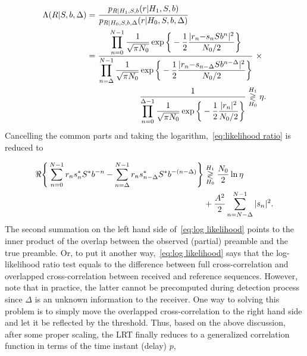 \begin{equation}
  \label{eq:likelihood ratio}
  \begin{aligned}
  \Lambda(R|S,b,\Delta)=&~\frac{p_{R|H_1,S,b}(r|H_1,S,b)}{p_{R|H_0,S,b,\Delta}(r|H_0,S,b,\Delta)} \\
  =&~\frac{\displaystyle \prod_{n=0}^{N-1}\frac{1}{\sqrt{\pi N_0}}\exp{\bigg\{-\frac{1}{2}\frac{|r_{n}{-}s_nSb^n|^2}{N_0/2}\bigg\}}}{\displaystyle \prod_{n=\Delta}^{N-1} \frac{1}{\sqrt{\pi N_0}} \exp{\bigg\{-\frac{1}{2}\frac{|r_{n}{-}s_{n-\Delta}Sb^{n-\Delta}|^2}{N_0/2}\bigg\}}} ~\times \\
  &\quad~~~~~~~~~~~~~ \frac{1}{\displaystyle \prod_{n=0}^{\Delta-1} \frac{1}{\sqrt{\pi N_0}} \exp{\bigg\{-\frac{1}{2}\frac{|r_n|^2}{N_0/2}\bigg\}}} \mathrel{\mathop\gtrless\limits^{H_1}_{H_0}} \eta.
  \end{aligned}
\end{equation}
Cancelling the common parts and taking the logarithm,~\eqref{eq:likelihood ratio} is reduced to

\begin{equation}
    \label{eq:log likelihood}
    \begin{aligned}
    \Re\Bigg\{\sum_{n=0}^{N-1}r_{n}s^*_nS^*b^{-n}-
    \sum_{n=\Delta}^{N-1}r_{n}s^*_{n-\Delta}S^*b^{-(n-\Delta)}\Bigg\}
    &\mathrel{\mathop\gtrless\limits^{H_1}_{H_0}} \frac{N_0}{2}\ln\eta \\
    &+\frac{A^2}{2}\sum_{n=N-\Delta}^{N-1}|s_n|^2.
    \end{aligned}
\end{equation}
The second summation on the left hand side of~\eqref{eq:log likelihood} points to the inner product of the overlap between
the observed (partial) preamble and the true preamble. 
Or, to put it another way,~\eqref{eq:log likelihood} says that the log-likelihood 
ratio test equals to the difference between full cross-correlation and overlapped cross-correlation
between received and reference sequences. 
However, note that in practice, the latter cannot be
precomputed during detection process since $\Delta$ is an unknown information to the receiver.
One way to solving this problem is to simply move the overlapped cross-correlation to the right hand side  and
let it be reflected by the threshold.
Thus, based on the above discussion, after some proper scaling, the LRT finally reduces to a generalized correlation function in terms of the time instant (delay) $p$,

